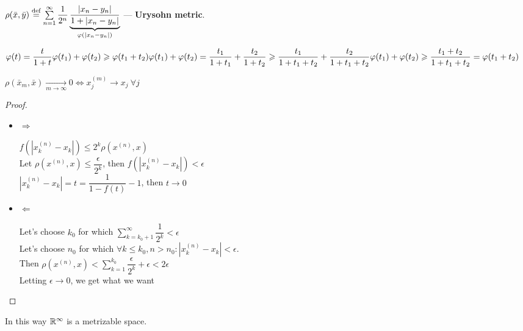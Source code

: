 \begin{defn}
  $\rho(\bar{x}, \bar{y}) \defeq \sum\limits_{n = 1}^\infty \dfrac{1}{2^n}\underbrace{\dfrac{|x_n - y_n|}{1 + |x_n - y_n|}}_{\phi(|x_n - y_n|)}$
  --- \textbf{Urysohn metric}.

  \noindent
  \begin{minipage}{.65\linewidth}
    $\displaystyle\phi(t) = \dfrac{t}{1 + t} \\ \\
    \phi(t_1) + \phi(t_2) \geq \phi(t_1 + t_2) \\ \\
    \phi(t_1) + \phi(t_2) = \dfrac{t_1}{1 + t_1} + \dfrac{t_2}{1 + t_2} \geq \dfrac{t_1}{1 + t_1 + t_2} + \dfrac{t_2}{1 + t_1 + t_2} \\ \\
    \phi(t_1) + \phi(t_2) \geq \dfrac{t_1 + t_2}{1 + t_1 + t_2} = \phi(t_1 + t_2)$
  \end{minipage}%
  \begin{minipage}{.35\linewidth}
  \end{minipage}
  \begin{stm}
      $\rho(\bar{x}_m, \bar{x}) \xrightarrow[m \to \infty]{} 0 \iff x_j^{(m)} \to x_j\ \forall j$
  \end{stm}
  \begin{proof}\leavevmode
    \begin{itemize}
      \item $\Rightarrow$

      $f(|x^{(n)}_k - x_k|) \leq 2^k \rho(x^{(n)}, x)$ \\
      Let $\rho(x^{(n)}, x) \le \dfrac{\epsilon}{2^k}$, then $f(|x^{(n)}_k - x_k|) < \epsilon$ \\
      $|x^{(n)}_k - x_k| = t = \dfrac{1}{1 - f(t)} - 1$, then $t \to 0$
      \item $\Leftarrow$

      Let's choose $k_0$ for which $\sum\limits_{k=k_0+1}^{\infty} \dfrac{1}{2^k} < \epsilon$ \\
      Let's choose $n_0$ for which $\forall k \leq k_0, n > n_0: |x_k^{(n)} - x_k| < \epsilon$. \\
      Then $\rho(x^{(n)}, x) < \sum\limits_{k=1}^{k_0} \dfrac{\epsilon}{2^k} + \epsilon < 2 \epsilon$ \\
      Letting  $\epsilon \to 0$, we get what we want \qedhere
    \end{itemize}
  \end{proof}
  In this way $\R^\infty$ is a metrizable space.
\end{defn}

